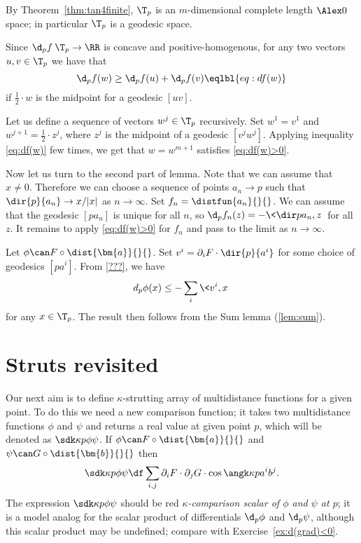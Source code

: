 By Theorem~\ref{thm:tan4finite},
$\T_p$ is an $m$-dimensional complete length $\Alex0$ space; 
in particular $\T_p$ is a geodesic space.

Since $\d_pf\:\T_p\to\RR$ is concave and positive-homogenous,
for any two vectors $u,v\in \T_p$ we have that 
\[\d_pf(w)\ge \d_pf(u) + \d_pf(v)
\eqlbl{eq:df(w)}\]
if $\tfrac12\cdot w$ is the midpoint for a geodesic $[uv]$.

Let us define a sequence of vectors $w^j\in\T_p$ recursively.
Set $w^1=v^1$ 
and $w^{j+1}=\tfrac12\cdot z^{j}$,
where $z^j$ is the midpoint of a geodesic $[v^j w^j]$.
Applying inequality \ref{eq:df(w)} few times, 
we get that $w=w^{m+1}$ satisfies \ref{eq:df(w)>0}.

Now let us turn to the second part of lemma.
Note that we can assume that $x\ne 0$.
Therefore we can choose a sequence of points $a_n\to p$ such that $\dir{p}{a_n}\to x/|x|$ as $n\to\infty$.
Set $f_n=\distfun{a_n}{}{}$.
We can assume that the geodesic $[pa_n]$ is unique for all $n$,
so $\d_pf_n(z)=-\<\dir p{a_n},z\>$ for all $z$.
It remains to apply \ref{eq:df(w)>0} for $f_n$
and pass to the limit as $n\to\infty$.
\qeds

Let $\phi\can F\circ\dist{\bm{a}}{}{}$.
Set $v^i=\partial_i F\cdot\dir{p}{a^i}$
for some choice of geodesics $[pa^i]$.
From \ref{???}, we have
\[d_p\phi(x)\le -\sum_i\<v^i,x\>\] 
for any $x\in\T_p$.
The result then follows from the Sum lemma (\ref{lem:sum}).
\qeds


\section{Struts revisited}

Our next aim is to define
$\kappa$-strutting array of multidistance functions for a given point.
To do this we need a new comparison function;
it takes two multidistance functions $\phi$ and $\psi$ and returns a real value at given point $p$,
which will be denoted as 
$\sdk\kappa{p}{\phi}{\psi}$.
If $\phi\can F\circ\dist{\bm{a}}{}{}$ 
and $\psi\can G\circ\dist{\bm{b}}{}{}$
then 
$$\sdk\kappa{p}{\phi}{\psi}
\df
\sum_{i,j}\partial_iF\cdot\partial_jG\cdot \cos\angk\kappa p{a^i}{b^j}.$$
The expression $\sdk\kappa{p}{\phi}{\psi}$
should be red \emph{$\kappa$-comparison scalar of $\phi$ and $\psi$ at $p$};
it is a model analog for the scalar product of differentials $\d_p\phi$ and $\d_p\psi$,
although this scalar product may be undefined;
compare with Exercise~\ref{ex:d(grad)<0}.


